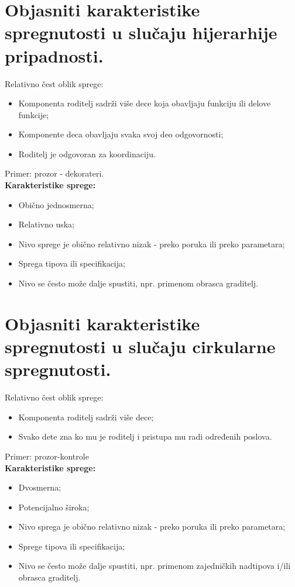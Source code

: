\documentclass[a4paper]{article}
\begin{document}
\section{Objasniti karakteristike spregnutosti u slučaju hijerarhije pripadnosti.}
\noindent Relativno čest oblik sprege:
  \begin{itemize}
    \item Komponenta roditelj sadrži više dece koja obavljaju funkciju ili delove funkcije;
    \item Komponente deca obavljaju svaka svoj deo odgovornosti;
    \item Roditelj je odgovoran za koordinaciju.
  \end{itemize}
Primer: prozor - dekorateri.\\
\textbf{Karakteristike sprege:}
  \begin{itemize}
    \item Obično jednosmerna;
    \item Relativno uska;
    \item Nivo sprege je obično relativno nizak - preko poruka ili preko parametara;
    \item Sprega tipova ili specifikacija;
    \item Nivo se često može dalje spustiti, npr. primenom obrasca graditelj.
  \end{itemize}

\section{Objasniti karakteristike spregnutosti u slučaju cirkularne spregnutosti.}
\noindent Relativno čest oblik sprege:
  \begin{itemize}
    \item Komponenta roditelj sadrži više dece;
    \item Svako dete zna ko mu je roditelj i pristupa mu radi određenih poslova.
  \end{itemize}
  Primer: prozor-kontrole\\
  \textbf{Karakteristike sprege:}
  \begin{itemize}
    \item Dvosmerna;
    \item Potencijalno široka;
    \item Nivo sprega je obično relativno nizak - preko poruka ili preko parametara;
    \item Sprege tipova ili specifikacija;
    \item Nivo se često može dalje spustiti, npr. primenom zajedničkih nadtipova 
          i/ili obrasca graditelj.
  \end{itemize}
\end{document}
